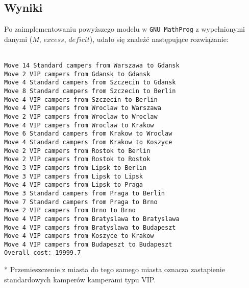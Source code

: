 \documentclass[12pt, a4paper]{article}
\begin{document}
\subsection{Wyniki}

Po zaimplementowaniu powyższego modelu w \texttt{GNU MathProg} z wypełnionymi danymi ($M$, $excess$, $deficit$), udało się znaleźć następujące
rozwiązanie:

\texttt{
\\
Move 14 Standard campers from Warszawa to Gdansk\\
Move 2 VIP campers from Gdansk to Gdansk\\
Move 4 Standard campers from Szczecin to Gdansk\\
Move 8 Standard campers from Szczecin to Berlin\\
Move 4 VIP campers from Szczecin to Berlin\\
Move 4 VIP campers from Wroclaw to Warszawa\\
Move 2 VIP campers from Wroclaw to Wroclaw\\
Move 4 VIP campers from Wroclaw to Krakow\\
Move 6 Standard campers from Krakow to Wroclaw\\
Move 4 Standard campers from Krakow to Koszyce\\
Move 2 VIP campers from Rostok to Berlin\\
Move 2 VIP campers from Rostok to Rostok\\
Move 3 VIP campers from Lipsk to Berlin\\
Move 3 VIP campers from Lipsk to Lipsk\\
Move 4 VIP campers from Lipsk to Praga\\
Move 3 Standard campers from Praga to Berlin\\
Move 7 Standard campers from Praga to Brno\\
Move 2 VIP campers from Brno to Brno\\
Move 4 VIP campers from Bratyslawa to Bratyslawa\\
Move 4 VIP campers from Bratyslawa to Budapeszt\\
Move 4 VIP campers from Koszyce to Krakow\\
Move 4 VIP campers from Budapeszt to Budapeszt\\
Overall cost: 19999.7\\}


* Przemieszczenie z miasta do tego samego miasta oznacza zastapienie standardowych kamperów kamperami typu VIP.
\end{document}
